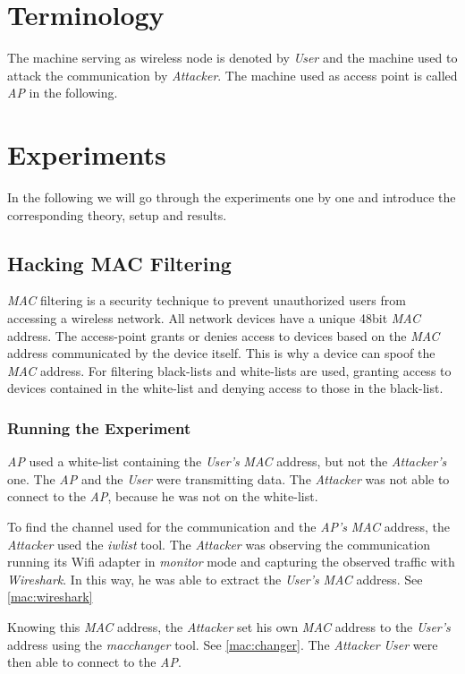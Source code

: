 \documentclass[12pt,a4paper]{article}
\begin{document}
	\section{Terminology}
	The machine serving as wireless node is denoted by \emph{User} and the machine used to attack the communication by \emph{Attacker}.
	The machine used as access point is called \emph{AP} in the following.
	
	
	\section{Experiments}
	In the following we will go through the experiments one by one and introduce the corresponding theory, setup and results.
	\subsection{Hacking MAC Filtering}
	\emph{MAC} filtering is a security technique to prevent unauthorized users from accessing a wireless network.
	All network devices have a unique 48bit \emph{MAC} address.
	The access-point grants or denies access to devices based on the \emph{MAC} address communicated by the device itself. This is why a device can spoof the \emph{MAC} address.
	For filtering black-lists and white-lists are used, granting access to devices contained in the white-list and denying access to those in the black-list.
	
	\subsubsection{Running the Experiment}
	\emph{AP} used a white-list containing the \emph{User's} \emph{MAC} address, but not the \emph{Attacker's} one.
	The \emph{AP} and the \emph{User} were transmitting data.
	The \emph{Attacker} was not able to connect to the \emph{AP}, because he was not on the white-list.
	
	To find the channel used for the communication and the \emph{AP's} \emph{MAC} address, the \emph{Attacker} used the \emph{iwlist} tool.
	The \emph{Attacker} was observing the communication running its Wifi adapter in \emph{monitor} mode and capturing the observed traffic with \emph{Wireshark}. In this way, he was able to extract the \emph{User's} \emph{MAC} address. See \autoref{mac:wireshark}
	
	Knowing this \emph{MAC} address, the \emph{Attacker} set his own \emph{MAC} address to the \emph{User's} address using the \emph{macchanger} tool. See \autoref{mac:changer}.
	The \emph{Attacker} \emph{User} were then able to connect to the \emph{AP}.
	
\end{document}
